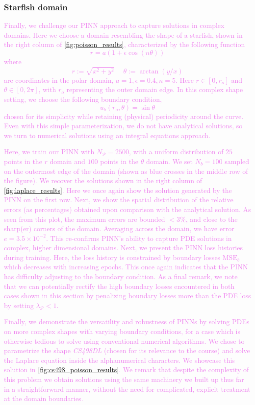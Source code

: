 \documentclass[11pt]{article}
\newcommand{\mse}{\textrm{MSE}}
\newcommand{\pde}{\ensuremath{\mathcal{P}}}
\newcommand{\newcontent}[1]{\textcolor{violet}{#1}}
\begin{document}
\subsubsection{Starfish domain}
\label{sec:orgaed67f3}
\newcontent{
Finally, we challenge our PINN approach to capture solutions in complex
domains. Here we choose a domain resembling the shape of a starfish, shown
in the right column of \cref{fig:poisson_results},
characterized by the following function
\[ r = a \left( 1 + \epsilon \cos{\left( n \theta \right)} \right) \]
where
\[ r := \sqrt{x^2 + y^2} \; \quad \theta := \arctan{\left(y/x\right)} \]
are coordinates in the polar domain, \(a = 1, \epsilon = 0.4 , n = 5\). Here
\(r \in [0, r_o]\) and \(\theta \in [0, 2\pi]\), with \(r_o\)
representing the outer domain edge. In this complex shape setting, we
choose the following boundary condition,
\[ u_b(r_o, \theta) = \sin{\theta}\]
chosen for its simplicity while retaining (physical) periodicity around the curve.
Even with this simple parameterization, we do not have
analytical solutions, so we turn
to numerical solutions using an integral equations approach.
}

\newcontent{
Here, we train our PINN with \(N_\pde = 2500\), with a uniform
distribution of \(25\) points in the \(r\) domain and \(100\) points in
the \(\theta\) domain. We set \(N_b = 100\) sampled on the outermost
edge of the domain (shown as blue crosses in the middle row of the figure).
We recover the solutions shown in the right column of
\cref{fig:laplace_results}. Here we once again show the
solution generated by the PINN on the first row. Next, we show the spatial
distribution of the relative errors (as percentages) obtained upon
comparison with the analytical solution. As
seen from this plot, the maximum errors are bounded \(< 3\%\), and close to
the sharp(er) corners of the domain. Averaging across the domain, we have error \(e = 3.5 \times 10^{-2}\).
This re-confirms PINN's ability to capture PDE
solutions in complex, higher dimensional domains. Next, we present the PINN loss histories
during training.
Here, the loss history is constrained by boundary losses \(\mse_{b}\)
which decreases with increasing epochs. This once again indicates that the
PINN has difficulty adjusting to the boundary condition. As a final remark,
we note that we can potentially rectify the high boundary losses encountered in both cases
shown in this section by penalizing boundary losses more than the PDE loss
by setting \(\lambda_{\pde} < 1\).
}

\newcontent{
Finally, we demonstrate the versatility and robustness of PINNs by solving
PDEs on more complex shapes with varying boundary conditions, for a case
which is otherwise tedious to solve using conventional numerical algorithms.
We chose to parametrize the shape \emph{CS498DL} (chosen for its
relevance to the course) and solve the Laplace equation inside the
alphanumerical characters. We showcase this solution in
\cref{fig:cs498_poisson_results}. We remark that despite the complexity of this
problem we obtain solutions using the same machinery we built up thus far in a
straightforward manner, without the need for complicated, explicit treatment
at the domain boundaries.
}
\end{document}
